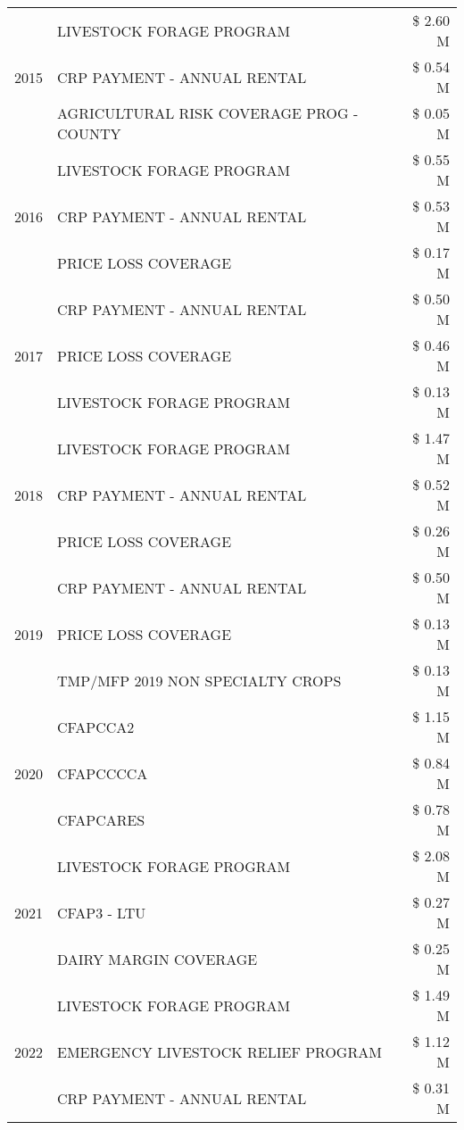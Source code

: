 \begin{tabular}{llr}
\cline{1-3}
\multirow[t]{3}{*}{2015} & LIVESTOCK FORAGE PROGRAM & \$ 2.60 M \\
 & CRP PAYMENT - ANNUAL RENTAL & \$ 0.54 M \\
 & AGRICULTURAL RISK COVERAGE PROG - COUNTY & \$ 0.05 M \\
\cline{1-3}
\multirow[t]{3}{*}{2016} & LIVESTOCK FORAGE PROGRAM & \$ 0.55 M \\
 & CRP PAYMENT - ANNUAL RENTAL & \$ 0.53 M \\
 & PRICE LOSS COVERAGE & \$ 0.17 M \\
\cline{1-3}
\multirow[t]{3}{*}{2017} & CRP PAYMENT - ANNUAL RENTAL & \$ 0.50 M \\
 & PRICE LOSS COVERAGE & \$ 0.46 M \\
 & LIVESTOCK FORAGE PROGRAM & \$ 0.13 M \\
\cline{1-3}
\multirow[t]{3}{*}{2018} & LIVESTOCK FORAGE PROGRAM & \$ 1.47 M \\
 & CRP PAYMENT - ANNUAL RENTAL & \$ 0.52 M \\
 & PRICE LOSS COVERAGE & \$ 0.26 M \\
\cline{1-3}
\multirow[t]{3}{*}{2019} & CRP PAYMENT - ANNUAL RENTAL & \$ 0.50 M \\
 & PRICE LOSS COVERAGE & \$ 0.13 M \\
 & TMP/MFP 2019 NON SPECIALTY CROPS & \$ 0.13 M \\
\cline{1-3}
\multirow[t]{3}{*}{2020} & CFAPCCA2 & \$ 1.15 M \\
 & CFAPCCCCA & \$ 0.84 M \\
 & CFAPCARES & \$ 0.78 M \\
\cline{1-3}
\multirow[t]{3}{*}{2021} & LIVESTOCK FORAGE PROGRAM & \$ 2.08 M \\
 & CFAP3 - LTU & \$ 0.27 M \\
 & DAIRY MARGIN COVERAGE & \$ 0.25 M \\
\cline{1-3}
\multirow[t]{3}{*}{2022} & LIVESTOCK FORAGE PROGRAM & \$ 1.49 M \\
 & EMERGENCY LIVESTOCK RELIEF PROGRAM & \$ 1.12 M \\
 & CRP PAYMENT - ANNUAL RENTAL & \$ 0.31 M \\
\cline{1-3}
\bottomrule
\end{tabular}
